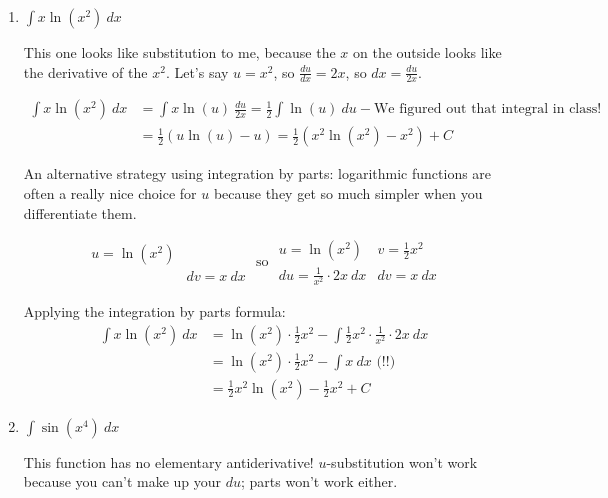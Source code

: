 \documentclass[10pt]{article}
\newenvironment{red}{\color{red}}{\ignorespacesafterend}
\newenvironment{blue}{\color{blue}}{\ignorespacesafterend}
\begin{document}
\begin{enumerate}[leftmargin=0pt]
\begin{enumerate}
    \item $\int x\ln(x^2)\ dx$
    
    \begin{red}
    This one looks like substitution to me, because the $x$ on the outside looks like the derivative of the $x^2$. Let's say $u = x^2$, so $\frac{du}{dx} = 2x$, so $dx = \frac{du}{2x}$.
    
    \begin{align*}
        \int x\ln(x^2)\ dx &= \int x \ln(u)\ \frac{du}{2x} = \frac12 \int\ln(u)\ du - \textrm{We figured out that integral in class!}\\
        &= \frac12\left(u\ln(u) - u\right) = \frac12\left(x^2 \ln(x^2) - x^2\right) + C
    \end{align*}
    \end{red}
    
    \begin{blue}
    An alternative strategy using integration by parts: logarithmic functions are often a really nice choice for $u$ because they get so much simpler when you differentiate them.
    
    \[\begin{array}{ll}
        u = \ln(x^2) &  \\
         & dv = x\ dx
    \end{array}
    \textrm{ so }
    \begin{array}{ll}
        u = \ln(x^2) & v = \tfrac12 x^2 \\
        du = \frac{1}{x^2}\cdot 2x\ dx & dv = x\ dx 
    \end{array}
    \]
    
    Applying the integration by parts formula:
    \begin{align*}
        \int x\ln(x^2)\ dx &= \ln(x^2) \cdot \tfrac12 x^2 - 
        \int \frac12 x^2 \cdot \frac{1}{x^2} \cdot 2x\ dx \\
        &= \ln(x^2) \cdot \tfrac12 x^2 - \int x\ dx \textrm{ (!!)} \\
        &= \frac12 x^2 \ln(x^2) - \frac12 x^2 + C
    \end{align*}
    \end{blue}
    
    \item $\int \sin(x^4)\ dx$
    
    \begin{red}
    This function has no elementary antiderivative! $u$-substitution won't work because you can't make up your $du$; parts won't work either.
    \end{red}
    

\end{enumerate}
\end{enumerate}
\end{document}
